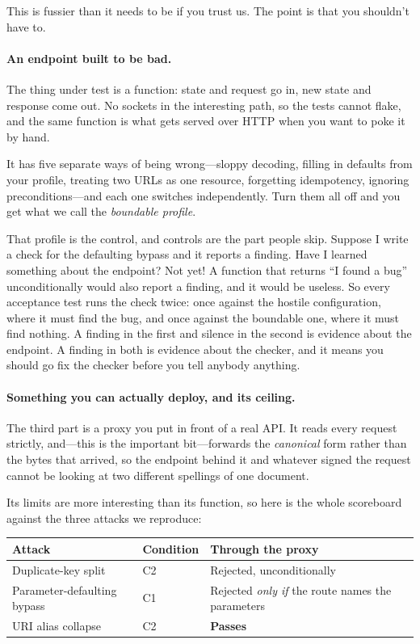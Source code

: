 \documentclass[11pt]{article}
\begin{document}
This is fussier than it needs to be if you trust us. The point is that you
shouldn't have to.

\paragraph{An endpoint built to be bad.}
The thing under test is a function: state and request go in, new state and
response come out. No sockets in the interesting path, so the tests cannot
flake, and the same function is what gets served over HTTP when you want to
poke it by hand.

It has five separate ways of being wrong---sloppy decoding, filling in
defaults from your profile, treating two URLs as one resource, forgetting
idempotency, ignoring preconditions---and each one switches independently. Turn
them all off and you get what we call the \emph{boundable profile}.

That profile is the control, and controls are the part people skip. Suppose I
write a check for the defaulting bypass and it reports a finding. Have I
learned something about the endpoint? Not yet! A function that returns ``I
found a bug'' unconditionally would also report a finding, and it would be
useless. So every acceptance test runs the check twice: once against the
hostile configuration, where it must find the bug, and once against the
boundable one, where it must find nothing. A finding in the first and silence
in the second is evidence about the endpoint. A finding in both is evidence
about the checker, and it means you should go fix the checker before you tell
anybody anything.

\paragraph{Something you can actually deploy, and its ceiling.}
The third part is a proxy you put in front of a real API. It reads every
request strictly, and---this is the important bit---forwards the
\emph{canonical} form rather than the bytes that arrived, so the endpoint
behind it and whatever signed the request cannot be looking at two different
spellings of one document.

Its limits are more interesting than its function, so here is the whole
scoreboard against the three attacks we reproduce:

\begin{center}
\begin{tabular}{lll}
\toprule
Attack & Condition & Through the proxy \\
\midrule
Duplicate-key split & C2 & Rejected, unconditionally \\
Parameter-defaulting bypass & C1 & Rejected \emph{only if} the route names the parameters \\
URI alias collapse & C2 & \textbf{Passes} \\
\bottomrule
\end{tabular}
\end{center}
\end{document}

